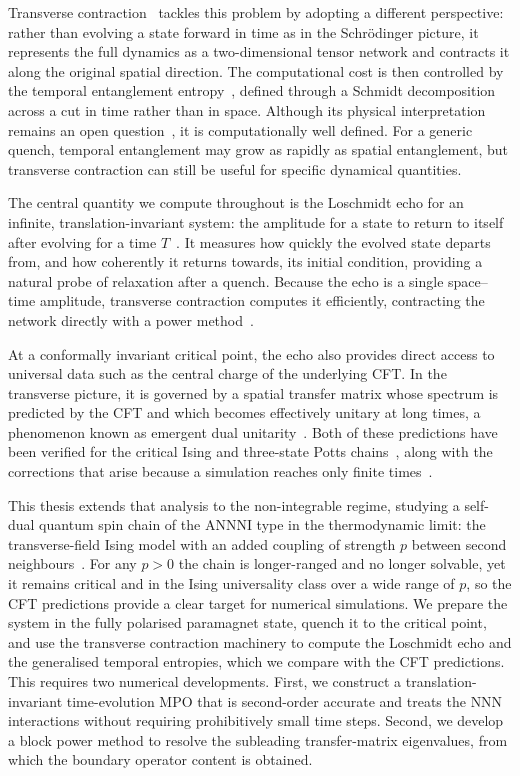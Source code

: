 \documentclass[a4paper,onecolumn,11pt,unpublished]{quantumarticle}
\begin{document}
Transverse contraction~\cite{banuls2009,muller_hermes2012,lerose2023} tackles this problem by adopting a different perspective: rather than evolving a state forward in time as in the Schr\"odinger picture, it represents the full dynamics as a two-dimensional tensor network and contracts it along the original spatial direction. The computational cost is then controlled by the temporal entanglement entropy~\cite{hastings_mahajan2015,lerose2021,carignano_marimon_tagliacozzo2024,foligno2023}, defined through a Schmidt decomposition across a cut in time rather than in space. Although its physical interpretation remains an open question~\cite{doi2023}, it is computationally well defined. For a generic quench, temporal entanglement may grow as rapidly as spatial entanglement, but transverse contraction can still be useful for specific dynamical quantities.

The central quantity we compute throughout is the Loschmidt echo for an infinite, translation-invariant system: the amplitude for a state to return to itself after evolving for a time $T$~\cite{gorin2006}. It measures how quickly the evolved state departs from, and how coherently it returns towards, its initial condition, providing a natural probe of relaxation after a quench. Because the echo is a single space--time amplitude, transverse contraction computes it efficiently, contracting the network directly with a power method~\cite{carignano_tagliacozzo2025}.

At a conformally invariant critical point, the echo also provides direct access to universal data such as the central charge of the underlying \ac{CFT}. In the transverse picture, it is governed by a spatial transfer matrix whose spectrum is predicted by the \ac{CFT} and which becomes effectively unitary at long times, a phenomenon known as emergent dual unitarity~\cite{bertini2019,carignano_tagliacozzo2025}. Both of these predictions have been verified for the critical Ising and three-state Potts chains~\cite{carignano_tagliacozzo2025}, along with the corrections that arise because a simulation reaches only finite times~\cite{boucomas2026}.

This thesis extends that analysis to the non-integrable regime, studying a self-dual quantum spin chain of the \ac{ANNNI} type in the thermodynamic limit: the transverse-field Ising model with an added coupling of strength $p$ between second neighbours~\cite{selke1988,alcaraz2016}. For any $p>0$ the chain is longer-ranged and no longer solvable, yet it remains critical and in the Ising universality class over a wide range of $p$, so the \ac{CFT} predictions provide a clear target for numerical simulations. We prepare the system in the fully polarised paramagnet state, quench it to the critical point, and use the transverse contraction machinery to compute the Loschmidt echo and the generalised temporal entropies, which we compare with the \ac{CFT} predictions. This requires two numerical developments. First, we construct a translation-invariant time-evolution \ac{MPO} that is second-order accurate and treats the \ac{NNN} interactions without requiring prohibitively small time steps. Second, we develop a block power method to resolve the subleading transfer-matrix eigenvalues, from which the boundary operator content is obtained.
\end{document}
